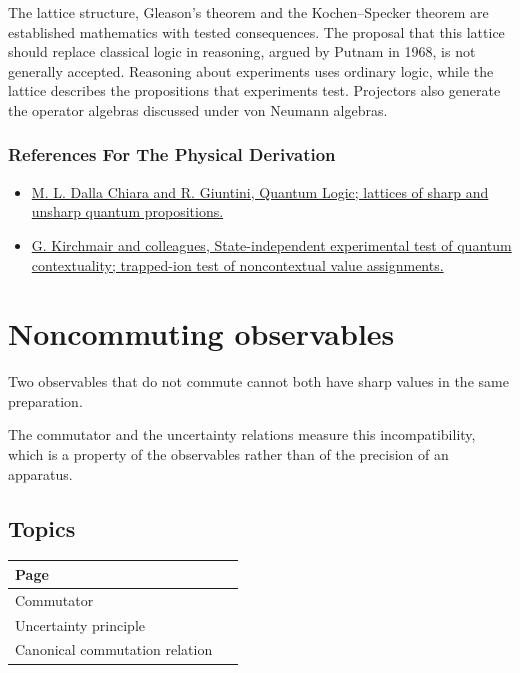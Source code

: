 \documentclass[11pt,oneside]{book}
\begin{document}
The lattice structure, Gleason's theorem and the Kochen--Specker theorem are established mathematics with tested consequences. The proposal that this lattice should replace classical logic in reasoning, argued by Putnam in 1968, is not generally accepted. Reasoning about experiments uses ordinary logic, while the lattice describes the propositions that experiments test. Projectors also generate the operator algebras discussed under von Neumann algebras.

\subsection*{References For The Physical Derivation}
\begin{itemize}
\item \href{https://arxiv.org/abs/quant-ph/0101028}{M. L. Dalla Chiara and R. Giuntini, Quantum Logic; lattices of sharp and unsharp quantum propositions.}
\item \href{https://arxiv.org/abs/0904.1655}{G. Kirchmair and colleagues, State-independent experimental test of quantum contextuality; trapped-ion test of noncontextual value assignments.}
\end{itemize}





\chapter{Noncommuting observables}

\begin{claimbox}

Two observables that do not commute cannot both have sharp values in the same preparation.

\end{claimbox}

The commutator and the uncertainty relations measure this incompatibility, which is a property of the observables rather than of the precision of an apparatus.

\section*{Topics}

\begin{longtable}{p{0.92\linewidth}}
\toprule
Page \\
\midrule
\endhead
{}\label{page:commutator}Commutator \\
\label{page:uncertainty-principle}Uncertainty principle \\
\label{page:canonical-commutation-relation}Canonical commutation relation \\
\bottomrule
\end{longtable}
\end{document}

